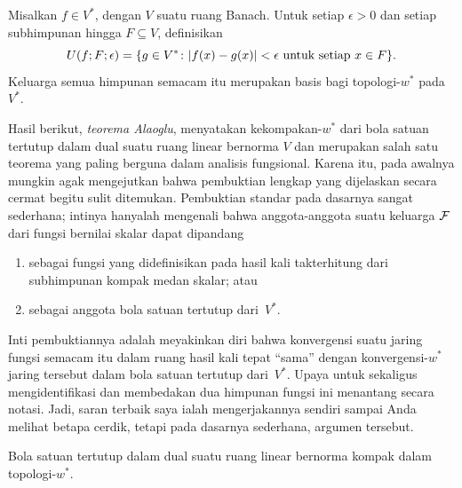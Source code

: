 \begin{prop} Misalkan $f \in V^*$, dengan $V$ suatu ruang Banach.  Untuk setiap $\epsilon > 0$ dan setiap
subhimpunan hingga $F \subseteq V$, definisikan
  \[ U(f;F;\epsilon)
           = \{g \in V^*\colon \lvert f(x) - g(x)\rvert < \epsilon \text{ untuk setiap $x \in F$}\}. \]
Keluarga semua himpunan semacam itu merupakan basis bagi topologi-$w^*$ pada~$V^*$.
\end{prop}

Hasil berikut, \emph{teorema Alaoglu}, menyatakan kekompakan-$w^*$ dari bola satuan tertutup dalam
dual suatu ruang linear bernorma $V$ dan merupakan salah satu teorema yang paling berguna dalam analisis fungsional.  Karena itu,
pada awalnya mungkin agak mengejutkan bahwa pembuktian lengkap yang dijelaskan secara cermat
begitu sulit ditemukan.  Pembuktian standar pada dasarnya sangat sederhana; intinya hanyalah mengenali
bahwa anggota-anggota suatu keluarga $\mathcal{F}$ dari fungsi bernilai skalar dapat dipandang
  \begin{enumerate}
     \item[(i)] sebagai fungsi yang didefinisikan pada hasil kali takterhitung dari subhimpunan kompak medan skalar; atau
     \item[(ii)] sebagai anggota bola satuan tertutup dari~$V^*$.
  \end{enumerate}
Inti pembuktiannya adalah meyakinkan diri bahwa konvergensi suatu jaring fungsi semacam itu dalam ruang hasil kali
tepat ``sama'' dengan konvergensi-$w^*$ jaring tersebut dalam bola satuan tertutup dari~$V^*$.  Upaya untuk sekaligus
mengidentifikasi dan membedakan dua himpunan fungsi ini menantang secara notasi.  Jadi, saran terbaik saya ialah mengerjakannya
sendiri sampai Anda melihat betapa cerdik, tetapi pada dasarnya sederhana, argumen tersebut.

\begin{thm}\label{C067441} Bola satuan tertutup dalam dual suatu ruang linear bernorma
kompak dalam topologi-$w^*$.
\end{thm}

